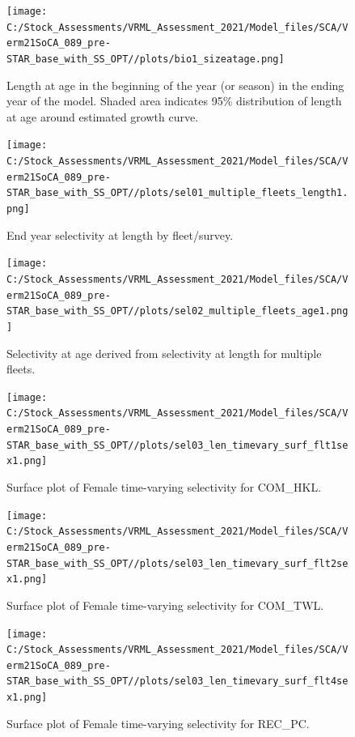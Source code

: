 \documentclass[
  english,
  a4paper,
]{article}
\begin{document}
\begin{figure}
\centering
\texttt{[image: C:/Stock\_Assessments/VRML\_Assessment\_2021/Model\_files/SCA/Verm21SoCA\_089\_pre-STAR\_base\_with\_SS\_OPT//plots/bio1\_sizeatage.png]}
\caption{Length at age in the beginning of the year (or season) in the ending year of the model. Shaded area indicates 95\% distribution of length at age around estimated growth curve.\label{fig:fittedgrowth}}
\end{figure}

\FloatBarrier

\begin{figure}
\centering
\texttt{[image: C:/Stock\_Assessments/VRML\_Assessment\_2021/Model\_files/SCA/Verm21SoCA\_089\_pre-STAR\_base\_with\_SS\_OPT//plots/sel01\_multiple\_fleets\_length1.png]}
\caption{End year selectivity at length by fleet/survey.\label{fig:selex-length-all}}
\end{figure}

\FloatBarrier

\begin{figure}
\centering
\texttt{[image: C:/Stock\_Assessments/VRML\_Assessment\_2021/Model\_files/SCA/Verm21SoCA\_089\_pre-STAR\_base\_with\_SS\_OPT//plots/sel02\_multiple\_fleets\_age1.png]}
\caption{Selectivity at age derived from selectivity at length for multiple fleets.\label{fig:selex-age-all}}
\end{figure}

\begin{figure}
\centering
\texttt{[image: C:/Stock\_Assessments/VRML\_Assessment\_2021/Model\_files/SCA/Verm21SoCA\_089\_pre-STAR\_base\_with\_SS\_OPT//plots/sel03\_len\_timevary\_surf\_flt1sex1.png]}
\caption{Surface plot of Female time-varying selectivity for COM\_HKL.\label{fig:sel03_len_timevary_surf_flt1sex1}}
\end{figure}

\begin{figure}
\centering
\texttt{[image: C:/Stock\_Assessments/VRML\_Assessment\_2021/Model\_files/SCA/Verm21SoCA\_089\_pre-STAR\_base\_with\_SS\_OPT//plots/sel03\_len\_timevary\_surf\_flt2sex1.png]}
\caption{Surface plot of Female time-varying selectivity for COM\_TWL.\label{fig:sel03_len_timevary_surf_flt2sex1}}
\end{figure}

\begin{figure}
\centering
\texttt{[image: C:/Stock\_Assessments/VRML\_Assessment\_2021/Model\_files/SCA/Verm21SoCA\_089\_pre-STAR\_base\_with\_SS\_OPT//plots/sel03\_len\_timevary\_surf\_flt4sex1.png]}
\caption{Surface plot of Female time-varying selectivity for REC\_PC.\label{fig:sel03_len_timevary_surf_flt4sex1}}
\end{figure}
\end{document}
